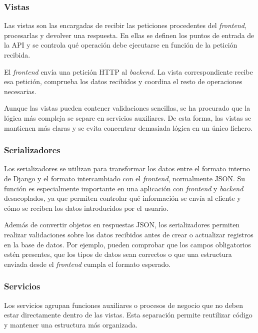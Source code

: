 \subsubsection{Vistas}

Las vistas son las encargadas de recibir las peticiones procedentes del \textit{frontend}, procesarlas y devolver una respuesta. En ellas se definen los puntos de entrada de la API y se controla qué operación debe ejecutarse en función de la petición recibida.

El \textit{frontend} envía una petición HTTP al \textit{backend}. La vista correspondiente recibe esa petición, comprueba los datos recibidos y coordina el resto de operaciones necesarias.

Aunque las vistas pueden contener validaciones sencillas, se ha procurado que la lógica más compleja se separe en servicios auxiliares. De esta forma, las vistas se mantienen más claras y se evita concentrar demasiada lógica en un único fichero.

\subsubsection{Serializadores}

Los serializadores se utilizan para transformar los datos entre el formato interno de Django y el formato intercambiado con el \textit{frontend}, normalmente JSON. Su función es especialmente importante en una aplicación con \textit{frontend} y \textit{backend} desacoplados, ya que permiten controlar qué información se envía al cliente y cómo se reciben los datos introducidos por el usuario.

Además de convertir objetos en respuestas JSON, los serializadores permiten realizar validaciones sobre los datos recibidos antes de crear o actualizar registros en la base de datos. Por ejemplo, pueden comprobar que los campos obligatorios estén presentes, que los tipos de datos sean correctos o que una estructura enviada desde el \textit{frontend} cumpla el formato esperado.

\subsubsection{Servicios}

Los servicios agrupan funciones auxiliares o procesos de negocio que no deben estar directamente dentro de las vistas. Esta separación permite reutilizar código y mantener una estructura más organizada.


